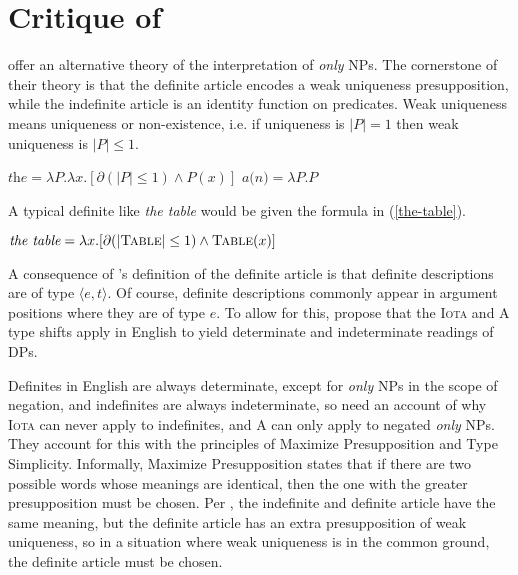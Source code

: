 \section{Critique of \citet{cb2015}\label{sec:coppock-beaver}}
\citet{cb2015} offer an alternative theory of the interpretation of \textit{only} NPs. The cornerstone of their theory is that the definite article encodes a weak uniqueness presupposition, while the indefinite article is an identity function on predicates. Weak uniqueness means uniqueness or non-existence, i.e. if uniqueness is $|P| = 1$ then weak uniqueness is $|P| \le 1$.

\begin{exe}
	\ex $\textit{the} = \lambda P . \lambda x . [\partial(|P| \le 1) \land P(x)]$
	\ex $\textit{a(n)} = \lambda P . P$
\end{exe}

A typical definite like \textit{the table} would be given the formula in (\ref{the-table}).

\begin{exe}
	\ex \label{the-table} $\textit{the table} = \lambda x . [ \partial(|\textsc{Table}| \le 1) \land \textsc{Table}(x) ]$
\end{exe}

A consequence of \citeauthor{cb2015}'s definition of the definite article is that definite descriptions are of type $\langle e, t \rangle$. Of course, definite descriptions commonly appear in argument positions where they are of type $e$. To allow for this, \citeauthor{cb2015} propose that the \textsc{Iota} and \textsc{A} type shifts apply in English to yield determinate and indeterminate readings of DPs.


Definites in English are always determinate, except for \textit{only} NPs in the scope of negation, and indefinites are always indeterminate, so \citeauthor{cb2015} need an account of why \textsc{Iota} can never apply to indefinites, and \textsc{A} can only apply to negated \textit{only} NPs. They account for this with the principles of Maximize Presupposition and Type Simplicity. Informally, Maximize Presupposition states that if there are two possible words whose meanings are identical, then the one with the greater presupposition must be chosen. Per \citeauthor{cb2015}, the indefinite and definite article have the same meaning, but the definite article has an extra presupposition of weak uniqueness, so in a situation where weak uniqueness is in the common ground, the definite article must be chosen.

